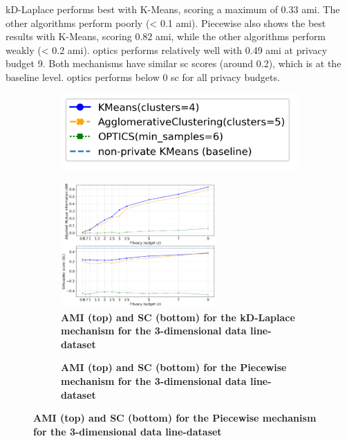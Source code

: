 \begin{figure}[H]
\begin{subfigure}{1\textwidth}
  \end{subfigure}
  \label{fig:validation-circle-dataset_comparison_3d-laplace}
\end{figure}
kD-Laplace performs best with K-Means, scoring a maximum of 0.33 \gls{ami}. The other algorithms perform poorly (< 0.1 \gls{ami}).
Piecewise also shows the best results with K-Means, scoring 0.82 \gls{ami}, while the other algorithms perform weakly (< 0.2 \gls{ami}).
\gls{optics} performs relatively well with 0.49 \gls{ami} at privacy budget 9.
Both mechanisms have similar \gls{sc} scores (around 0.2), which is at the baseline level.
\gls{optics} performs below 0 \gls{sc} for all privacy budgets.
\newpage
\begin{figure}[H]
  \centering
  \begin{subfigure}{0.3\textwidth}
    \includegraphics[width=\textwidth]{Results/kd-laplace/kd-Laplace/line-dataset/legend_3.png}
  \end{subfigure}
  \begin{subfigure}{1\textwidth}
    \caption{\textbf{AMI (top) and SC (bottom) for the kD-Laplace mechanism for the 3-dimensional data line-dataset}}
    \centering
    \includegraphics[width=0.65\textwidth]{Results/kd-laplace/kd-Laplace/line-dataset/ami-and-sc_3_dimensions.png}
    \centering
  \end{subfigure}
  \begin{subfigure}{1\textwidth}
    \caption{\textbf{AMI (top) and SC (bottom) for the Piecewise mechanism for the 3-dimensional data line-dataset}}

\end{subfigure}
\end{figure}
